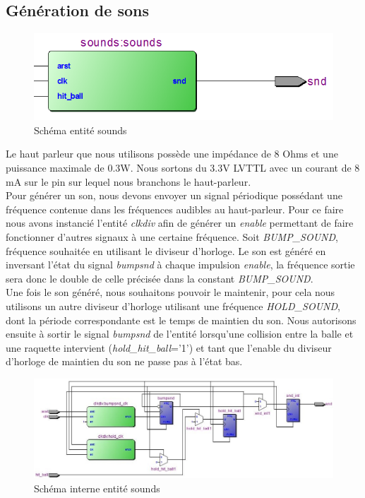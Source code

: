 \subsection{Génération de sons}
\begin{figure}[h!]
	\centering
	\includegraphics[scale=0.75]{images/soundsschem.png}
	\caption{Schéma entité sounds}
	\label{fig:soundschem}
\end{figure}

Le haut parleur que nous utilisons possède une impédance de 8 Ohms et une puissance maximale de 0.3W. Nous sortons du 3.3V LVTTL avec un courant de 8 mA sur le pin sur lequel nous branchons le haut-parleur.\\

Pour générer un son, nous devons envoyer un signal périodique possédant une fréquence contenue dans les fréquences audibles au haut-parleur. Pour ce faire nous avons instancié l'entité \emph{clkdiv} afin de générer un \emph{enable} permettant de faire fonctionner d'autres signaux à une certaine fréquence. Soit \emph{BUMP\_SOUND}, fréquence souhaitée en utilisant le diviseur d'horloge. Le son est généré en inversant l'état du signal \emph{bumpsnd} à chaque impulsion \emph{enable}, la fréquence sortie sera donc le double de celle précisée dans la constant \emph{BUMP\_SOUND}.\\

Une fois le son généré, nous souhaitons pouvoir le maintenir, pour cela nous utilisons un autre diviseur d'horloge utilisant une fréquence \emph{HOLD\_SOUND}, dont la période correspondante est le temps de maintien du son. Nous autorisons ensuite à sortir le signal \emph{bumpsnd} de l'entité lorsqu'une collision entre la balle et une raquette intervient (\emph{hold\_hit\_ball}='1') et tant que l'enable du diviseur d'horloge de maintien du son ne passe pas à l'état bas.

\begin{figure}[h!]
	\centering
	\includegraphics[scale=0.70]{images/soundsschem2.jpg}
	\caption{Schéma interne entité sounds}
	\label{fig:soundschem2}
\end{figure}

\newpage
